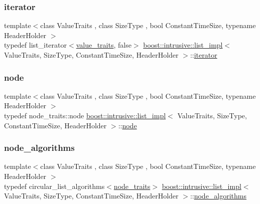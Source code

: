 \subsubsection{\texorpdfstring{iterator}{iterator}}
{\footnotesize\ttfamily template$<$class Value\+Traits , class Size\+Type , bool Constant\+Time\+Size, typename Header\+Holder $>$ \\
typedef list\+\_\+iterator$<$\hyperlink{classboost_1_1intrusive_1_1list__impl_a5cd55672f6df367749d91ef708834126}{value\+\_\+traits}, false$>$ \hyperlink{classboost_1_1intrusive_1_1list__impl}{boost\+::intrusive\+::list\+\_\+impl}$<$ Value\+Traits, Size\+Type, Constant\+Time\+Size, Header\+Holder $>$\+::\hyperlink{classboost_1_1intrusive_1_1list__impl_a15c0189bf62eb9fb98bc07ef10b8cb23}{iterator}}

\mbox{\label{classboost_1_1intrusive_1_1list__impl_aaaa96a7e3013b33e4da86a3725352844}} 
\subsubsection{\texorpdfstring{node}{node}}
{\footnotesize\ttfamily template$<$class Value\+Traits , class Size\+Type , bool Constant\+Time\+Size, typename Header\+Holder $>$ \\
typedef node\+\_\+traits\+::node \hyperlink{classboost_1_1intrusive_1_1list__impl}{boost\+::intrusive\+::list\+\_\+impl}$<$ Value\+Traits, Size\+Type, Constant\+Time\+Size, Header\+Holder $>$\+::\hyperlink{classboost_1_1intrusive_1_1list__impl_aaaa96a7e3013b33e4da86a3725352844}{node}}

\mbox{\label{classboost_1_1intrusive_1_1list__impl_ad71774881b8a43de5d41e39af79afcaf}} 
\subsubsection{\texorpdfstring{node\+\_\+algorithms}{node\_algorithms}}
{\footnotesize\ttfamily template$<$class Value\+Traits , class Size\+Type , bool Constant\+Time\+Size, typename Header\+Holder $>$ \\
typedef circular\+\_\+list\+\_\+algorithms$<$\hyperlink{classboost_1_1intrusive_1_1list__impl_ae96503e0398292d5763e84a6baf677ba}{node\+\_\+traits}$>$ \hyperlink{classboost_1_1intrusive_1_1list__impl}{boost\+::intrusive\+::list\+\_\+impl}$<$ Value\+Traits, Size\+Type, Constant\+Time\+Size, Header\+Holder $>$\+::\hyperlink{classboost_1_1intrusive_1_1list__impl_ad71774881b8a43de5d41e39af79afcaf}{node\+\_\+algorithms}}


